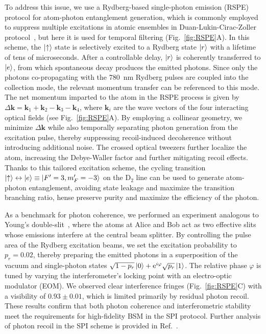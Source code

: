 \documentclass[aps,reprint,showpacs,superscriptaddress]{revtex4-2}
\begin{document}
To address this issue, we use a Rydberg-based single-photon emission (RSPE) protocol for atom-photon entanglement generation, which is commonly employed to suppress multiple excitations in atomic ensembles in Duan-Lukin-Cirac-Zoller protocol~\cite{yang2025entangling,dudin2012strongly}, but here it is used for temporal filtering (Fig.~\ref{fig:RSPE}A). In this scheme, the $\ket{\uparrow}$ state is selectively excited to a Rydberg state $\ket{r}$ with a lifetime of tens of microseconds. After a controllable delay, $\ket{r}$ is coherently transferred to $\ket{e}$, from which spontaneous decay produces the emitted photons. Since only the photons co-propagating with the 780~nm Rydberg pulses are coupled into the collection mode, the relevant momentum transfer can be referenced to this mode. The net momentum imparted to the atom in the RSPE process is given by
$\Delta \mathbf{k} = \mathbf{k}_1 + \mathbf{k}_2 - \mathbf{k}_3 - \mathbf{k}_4$, where $\mathbf{k}_i$ are the wave vectors of the four interacting optical fields (see Fig.~\ref{fig:RSPE}A). By employing a collinear geometry, we minimize $\Delta \mathbf{k}$ while also temporally separating photon generation from the excitation pulse, thereby suppressing recoil-induced decoherence without introducing additional noise. The crossed optical tweezers further localize the atom, increasing the Debye-Waller factor and further mitigating recoil effects. Thanks to this tailored excitation scheme, the cycling transition $\ket{\uparrow}\leftrightarrow\ket{e}\equiv\ket{F'=3, m_{F}'=-3}$ on the D$_2$ line can be used to generate atom-photon entanglement, avoiding state leakage and maximize the transition branching ratio, hense preserve purity and maximize the efficiency of the photon.

As a benchmark for photon coherence, we performed an experiment analogous to Young's double-slit~\cite{fedoseev2025coherent,zhang2025Tunable}, where the atoms at Alice and Bob act as two effective slits whose emissions interfere at the central beam splitter. By controlling the pulse area of the Rydberg excitation beams, we set the excitation probability to $p_r = 0.02$, thereby preparing the emitted photons in a superposition of the vacuum and single-photon states $\sqrt{1-p_r}\ket{0}+\text{e}^{i\varphi}\sqrt{p_r}\ket{1}$. The relative phase $\varphi$ is tuned by varying the interferometer's locking point with an electro-optic modulator (EOM). We observed clear interference fringes (Fig.~\ref{fig:RSPE}C) with a visibility of $0.93 \pm 0.01$, which is limited primarily by residual photon recoil. These results confirm that both photon coherence and interferometric stability meet the requirements for high-fidelity BSM in the SPI protocol. Further analysis of photon recoil in the SPI scheme is provided in Ref.~\cite{SM}.
\end{document}
